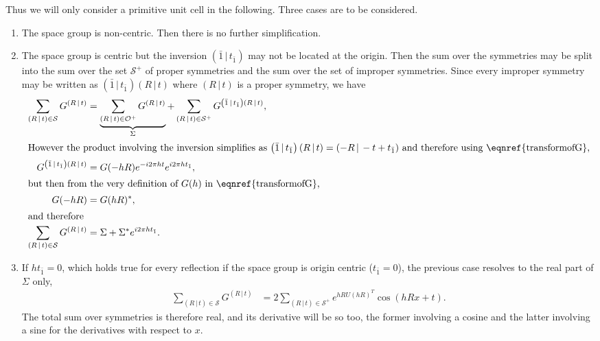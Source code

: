 \documentclass[pdf]{iucr}
\newcommand{\sym}[2]{\left( #1\,\vert\, #2 \right)}
\newcommand{\inversion}{ \sym{\bar{1}}{t_{\bar{1}}} }
\begin{document}
Thus we will only consider a primitive unit cell in the following. Three cases are to be considered.
\begin{enumerate}
\item The space group is non-centric. Then there is no further simplification.
\item The space group is centric but the inversion $\inversion$ may not be located at the origin. Then the sum over the symmetries may be split into the sum over the set $\mathcal{S}^+$ of proper symmetries and the sum over the set of  improper symmetries. Since every improper symmetry may be written as $\inversion\sym{R}{t}$ where $\sym{R}{t}$ is a proper symmetry, we have
\begin{align}
\sum_{\sym{R}{t} \in \mathcal{S}} G^{\sym{R}{t}} &= 
\underbrace{\sum_{\sym{R}{t} \in \cal{O^+}} G^{\sym{R}{t}} }_{\Sigma} 
+ \sum_{\sym{R}{t} \in \mathcal{S}^+} G^{\inversion \sym{R}{t}}, \nonumber \\
\shortintertext{However the product involving the inversion simplifies as 
$\inversion\sym{R}{t} = \sym{-R}{-t + t_{\bar{1}}}$ and therefore using \eqnref{transformofG},}
G^{\inversion\sym{R}{t}} &= G(-hR) e^{-i2\pi ht} e^{i2\pi h t_{\bar{1}}}, \nonumber \\
 \shortintertext{but then from the very definition of $G(h)$ in \eqnref{transformofG},}
 G(-hR) &= G(hR)^*, \\
 \shortintertext{and therefore}
 \sum_{\sym{R}{t} \in \mathcal{S}} G^{\sym{R}{t}} &= \Sigma + \Sigma^* e^{i2\pi h t_{\bar{1}}}.
 \label{eqn:sumofGforcentricgroups}
\end{align}

\item If $h t_{\bar{1}}=0$, which holds true for every reflection if the space group is origin centric ($t_{\bar{1}}=0$), the previous case resolves to the real part of $\Sigma$ only,
\begin{align}
 \sum_{\sym{R}{t} \in \mathcal{S}} G^{\sym{R}{t}} & = 2 \sum_{\sym{R}{t} \in \mathcal{S}^+}  e^{h R U (hR)^T} \cos(hRx + t).
\end{align}
The total sum over symmetries is therefore real, and its derivative will be so too, the former involving a cosine and the latter involving a sine for the derivatives with respect to $x$. 
\end{enumerate}
\end{document}
